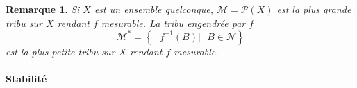 \documentclass[3pt]{article}
\newtheorem{remark}[theorem]{Remarque}
\begin{document}
\bigskip

\begin{remark}
Si $X$ est un ensemble quelconque, $\mathcal{M=P}(X)$ est la plus grande
tribu sur $X$ rendant $f$ mesurable. La tribu engendr\'{e}e par $f\ $%
\begin{equation*}
\mathcal{M}^{\ast }\mathcal{=}\left\{ \text{ }f^{-1}(B)|\text{ }B\in 
\mathcal{N}\right\}
\end{equation*}%
est la plus petite tribu sur $X$ rendant $f$ mesurable.
\end{remark}

\paragraph{Stabilit\'{e}}

\bigskip
\end{document}
